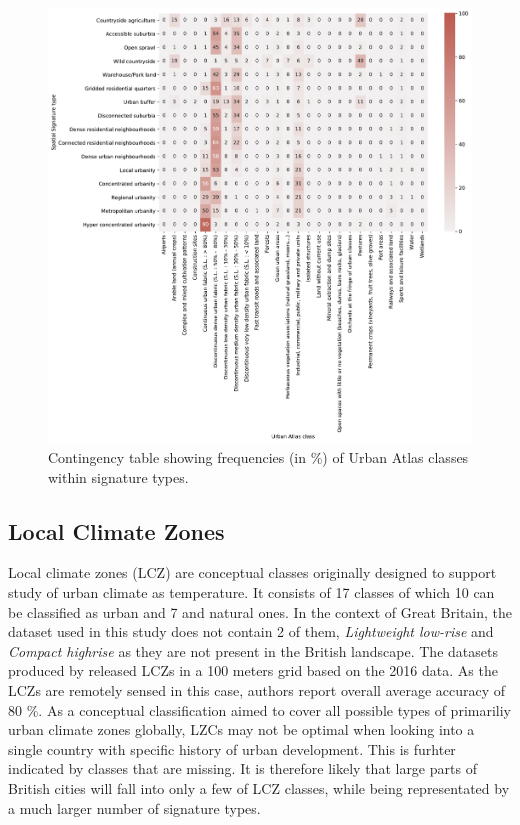 \begin{figure}
    \centering
    \includegraphics[width=\linewidth]{fig/crosstab_ua.pdf}
    \caption{Contingency table showing frequencies (in \%) of Urban Atlas classes within signature types.}
    \label{fig:crosstab_ua}
\end{figure}

\subsection*{Local Climate Zones}
Local climate zones (LCZ) are conceptual classes originally designed to support study of urban
climate as temperature. It consists of 17 classes of which 10 can be classified as urban
and 7 and natural ones. In the context of Great Britain, the dataset used in this study
does not contain 2 of them, \textit{Lightweight low-rise} and \textit{Compact highrise}
as they are not present in the British landscape. The datasets produced by
\cite{demuzere2019mapping} released LCZs in a 100 meters grid based on the 2016 data. As
the LCZs are remotely sensed in this case, authors report overall average accuracy of 80 \%.
As a conceptual classification aimed to cover all possible types of primariliy urban climate zones globally,
LZCs may not be optimal when looking into a single country with specific history of urban
development. This is furhter indicated by classes that are missing. It is therefore likely
that large parts of British cities will fall into only a few of LCZ classes, while being representated
by a much larger number of signature types.

